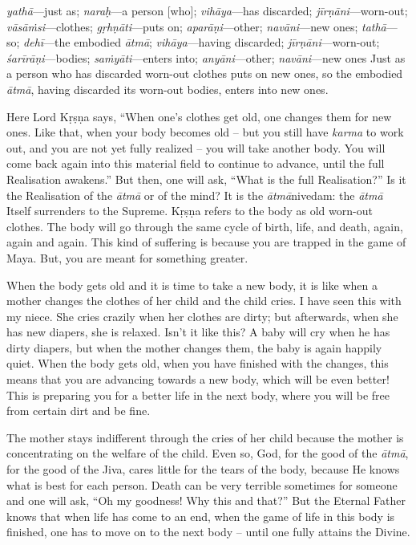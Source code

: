 {%
  \textit{yathā}---just as; 
  \textit{naraḥ}---a person [who]; 
  \textit{vihāya}---has discarded; 
  \textit{jīrṇāni}---worn-out; 
  \textit{vāsāṁsi}---clothes; 
  \textit{gṛhṇāti}---puts on; 
  \textit{aparāṇi}---other; 
  \textit{navāni}---new ones; 
  \textit{tathā}---so; 
  \textit{dehī}---the embodied \textit{ātmā}; 
  \textit{vihāya}---having discarded; 
  \textit{jīrṇāni}---worn-out; 
  \textit{śarīrāṇi}---bodies; 
  \textit{saṁyāti}---enters into; 
  \textit{anyāni}---other; 
  \textit{navāni}---new ones
}
{%
  Just as a person who has discarded worn-out clothes puts on new ones, so the embodied \textit{ātmā}, having discarded its worn-out bodies, enters into new ones.
}

Here Lord Kṛṣṇa says, “When one’s clothes get old, one changes them for new ones. Like that, when your body becomes old – but you still have \textit{karma} to work out, and you are not yet fully realized – you will take another body. You will come back again into this material field to continue to advance, until the full Realisation awakens.” But then, one will ask, “What is the full Realisation?” Is it the Realisation of the \textit{ātmā} or of the mind? It is the \textit{ātmā}nivedam: the \textit{ātmā} Itself surrenders to the Supreme. Kṛṣṇa refers to the body as old worn-out clothes. The body will go through the same cycle of birth, life, and death, again, again and again. This kind of suffering is because you are trapped in the game of Maya. But, you are meant for something greater.

When the body gets old and it is time to take a new body, it is like when a mother changes the clothes of her child and the child cries. I have seen this with my niece. She cries crazily when her clothes are dirty; but afterwards, when she has new diapers, she is relaxed. Isn’t it like this? A baby will cry when he has dirty diapers, but when the mother changes them, the baby is again happily quiet. When the body gets old, when you have finished with the changes, this means that you are advancing towards a new body, which will be even better! This is preparing you for a better life in the next body, where you will be free from certain dirt and be fine.

The mother stays indifferent through the cries of her child because the mother is concentrating on the welfare of the child. Even so, God, for the good of the \textit{ātmā}, for the good of the Jiva, cares little for the tears of the body, because He knows what is best for each person. Death can be very terrible sometimes for someone and one will ask, “Oh my goodness! Why this and that?” But the Eternal Father knows that when life has come to an end, when the game of life in this body is finished, one has to move on to the next body – until one fully attains the Divine.

